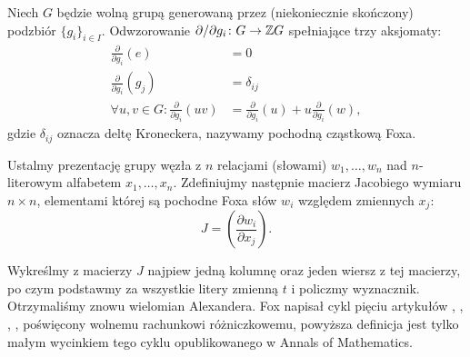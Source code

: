\begin{definition}
    Niech $G$ będzie wolną grupą generowaną przez (niekoniecznie skończony) podzbiór $\{g_i\}_{i \in I}$.
    Odwzorowanie $\partial/\partial g_i \colon G \to \mathbb Z G$ spełniające trzy aksjomaty:
    \begin{align}
        \frac{\partial}{\partial g_i} (e) & = 0 \\
        \frac{\partial}{\partial g_i} (g_j) & = \delta_{ij} \\
        \forall u, v \in G : \frac{\partial}{\partial g_i} (uv) & = \frac{\partial}{\partial g_i}(u) + u \frac{\partial}{\partial g_i} (w),
    \end{align}
    gdzie $\delta_{ij}$ oznacza deltę Kroneckera, nazywamy pochodną cząstkową Foxa.
\end{definition}

Ustalmy prezentację grupy węzła z $n$ relacjami (słowami) $w_1, \ldots, w_n$ nad $n$-literowym alfabetem $x_1, \ldots, x_n$.
Zdefiniujmy następnie macierz Jacobiego wymiaru $n \times n$, elementami której są pochodne Foxa słów $w_i$ względem zmiennych $x_j$:
\begin{equation}
    J = \left(\frac{\partial w_i}{\partial x_j}\right).
\end{equation}

Wykreślmy z macierzy $J$ najpiew jedną kolumnę oraz jeden wiersz z tej macierzy, po czym podstawmy za wszystkie litery zmienną $t$ i policzmy wyznacznik.
Otrzymaliśmy znowu wielomian Alexandera.
Fox napisał cykl pięciu artykułów \cite{fox53}, \cite{fox54}, \cite{fox56}, \cite{fox58}, \cite{fox60} poświęcony wolnemu rachunkowi różniczkowemu, powyższa definicja jest tylko małym wycinkiem tego cyklu opublikowanego w Annals of Mathematics.

